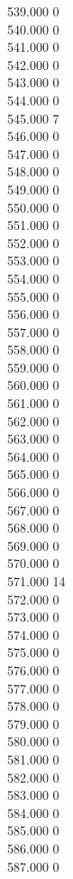 { 539.000	0 \\
 540.000	0 \\
 541.000	0 \\
 542.000	0 \\
 543.000	0 \\
 544.000	0 \\
 545.000	7 \\
 546.000	0 \\
 547.000	0 \\
 548.000	0 \\
 549.000	0 \\
 550.000	0 \\
 551.000	0 \\
 552.000	0 \\
 553.000	0 \\
 554.000	0 \\
 555.000	0 \\
 556.000	0 \\
 557.000	0 \\
 558.000	0 \\
 559.000	0 \\
 560.000	0 \\
 561.000	0 \\
 562.000	0 \\
 563.000	0 \\
 564.000	0 \\
 565.000	0 \\
 566.000	0 \\
 567.000	0 \\
 568.000	0 \\
 569.000	0 \\
 570.000	0 \\
 571.000	14 \\
 572.000	0 \\
 573.000	0 \\
 574.000	0 \\
 575.000	0 \\
 576.000	0 \\
 577.000	0 \\
 578.000	0 \\
 579.000	0 \\
 580.000	0 \\
 581.000	0 \\
 582.000	0 \\
 583.000	0 \\
 584.000	0 \\
 585.000	0 \\
 586.000	0 \\
 587.000	0 \\
}
